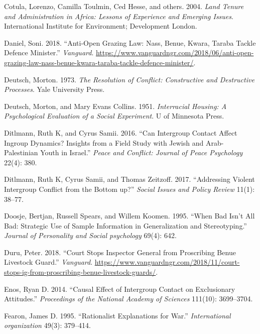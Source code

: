 \documentclass[11pt]{article}
\begin{document}
\begin{cslreferences}
\leavevmode\hypertarget{ref-cotula2004land}{}%
Cotula, Lorenzo, Camilla Toulmin, Ced Hesse, and others. 2004.
\emph{Land Tenure and Administration in Africa: Lessons of Experience
and Emerging Issues}. International Institute for Environment;
Development London.

\leavevmode\hypertarget{ref-daniel2018anti}{}%
Daniel, Soni. 2018. ``Anti-Open Grazing Law: Nass, Benue, Kwara, Taraba
Tackle Defence Minister.'' \emph{Vanguard}.
\url{https://www.vanguardngr.com/2018/06/anti-open-grazing-law-nass-benue-kwara-taraba-tackle-defence-minister/}.

\leavevmode\hypertarget{ref-deutsch1973resolution}{}%
Deutsch, Morton. 1973. \emph{The Resolution of Conflict: Constructive
and Destructive Processes}. Yale University Press.

\leavevmode\hypertarget{ref-deutsch1951interracial}{}%
Deutsch, Morton, and Mary Evans Collins. 1951. \emph{Interracial
Housing: A Psychological Evaluation of a Social Experiment}. U of
Minnesota Press.

\leavevmode\hypertarget{ref-ditlmann2016can}{}%
Ditlmann, Ruth K, and Cyrus Samii. 2016. ``Can Intergroup Contact Affect
Ingroup Dynamics? Insights from a Field Study with Jewish and
Arab-Palestinian Youth in Israel.'' \emph{Peace and Conflict: Journal of
Peace Psychology} 22(4): 380.

\leavevmode\hypertarget{ref-ditlmann2017addressing}{}%
Ditlmann, Ruth K, Cyrus Samii, and Thomas Zeitzoff. 2017. ``Addressing
Violent Intergroup Conflict from the Bottom up?'' \emph{Social Issues
and Policy Review} 11(1): 38--77.

\leavevmode\hypertarget{ref-doosje1995bad}{}%
Doosje, Bertjan, Russell Spears, and Willem Koomen. 1995. ``When Bad
Isn't All Bad: Strategic Use of Sample Information in Generalization and
Stereotyping.'' \emph{Journal of Personality and Social psychology}
69(4): 642.

\leavevmode\hypertarget{ref-duru2018court}{}%
Duru, Peter. 2018. ``Court Stops Inspector General from Proscribing
Benue Livestock Guard.'' \emph{Vanguard}.
\url{https://www.vanguardngr.com/2018/11/court-stops-ig-from-proscribing-benue-livestock-guards/}.

\leavevmode\hypertarget{ref-enos2014causal}{}%
Enos, Ryan D. 2014. ``Causal Effect of Intergroup Contact on
Exclusionary Attitudes.'' \emph{Proceedings of the National Academy of
Sciences} 111(10): 3699--3704.

\leavevmode\hypertarget{ref-fearon1995rationalist}{}%
Fearon, James D. 1995. ``Rationalist Explanations for War.''
\emph{International organization} 49(3): 379--414.


\end{cslreferences}
\end{document}
